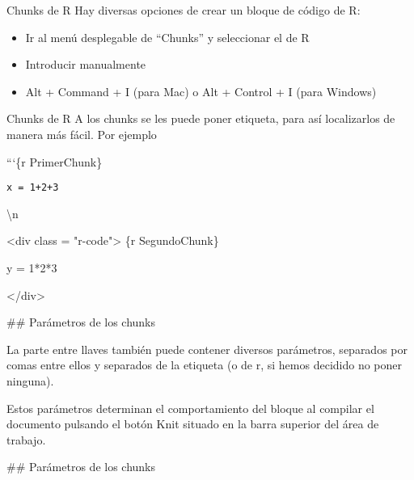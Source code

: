 \documentclass[
  ignorenonframetext,
]{beamer}
\newenvironment{Shaded}{\begin{snugshade}}{\end{snugshade}}
\newcommand{\NormalTok}[1]{#1}
\providecommand{\tightlist}{%
  \setlength{\itemsep}{0pt}\setlength{\parskip}{0pt}}
\begin{document}
\begin{frame}{Chunks de R}
\protect\hypertarget{chunks-de-r-1}{}
Hay diversas opciones de crear un bloque de código de R:

\begin{itemize}
\tightlist
\item
  Ir al menú desplegable de ``Chunks'' y seleccionar el de R
\item
  Introducir manualmente
\item
  Alt + Command + I (para Mac) o Alt + Control + I (para Windows)
\end{itemize}
\end{frame}

\begin{frame}[fragile]{Chunks de R}
\protect\hypertarget{chunks-de-r-2}{}
A los chunks se les puede poner etiqueta, para así localizarlos de
manera más fácil. Por ejemplo

```\{r PrimerChunk\}

\texttt{x\ =\ 1+2+3}

\begin{Shaded}
\begin{Highlighting}[]

\NormalTok{\textbackslash{}n}


\NormalTok{\textless{}div class = "r{-}code"\textgreater{}}
\NormalTok{\textasciigrave{}\textasciigrave{}\textasciigrave{}\{r SegundoChunk\}}

\NormalTok{\textasciigrave{} y = 1*2*3\textasciigrave{}}

\NormalTok{\textasciigrave{}\textasciigrave{}\textasciigrave{}\textless{}/div\textgreater{}}




\NormalTok{\#\# Parámetros de los chunks}

\NormalTok{La parte entre llaves también puede contener diversos parámetros, separados por comas entre ellos y separados de la etiqueta (o de r, si hemos decidido no poner ninguna).}

\NormalTok{Estos parámetros determinan el comportamiento del bloque al compilar el documento pulsando el botón \textasciigrave{}Knit\textasciigrave{} situado en la barra superior del área de trabajo.}

\NormalTok{\#\# Parámetros de los chunks}


\end{Highlighting}
\end{Shaded}
\end{frame}
\end{document}

